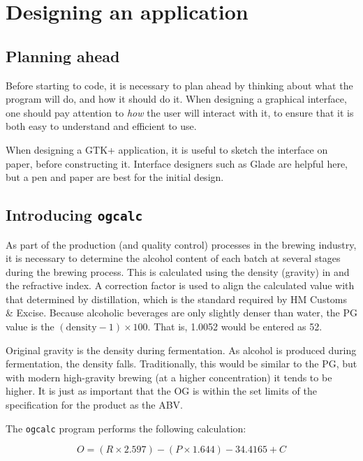 \documentclass[a4paper,oneside]{article}
\newcommand{\program}[1]{\texttt{#1}}
\begin{document}
\section{Designing an application}

\subsection{Planning ahead}

Before starting to code, it is necessary to plan ahead by thinking
about what the program will do, and how it should do it.  When
designing a graphical interface, one should pay attention to
\emph{how} the user will interact with it, to ensure that it is both
easy to understand and efficient to use.

When designing a GTK+ application, it is useful to sketch the
interface on paper, before constructing it.  Interface designers such
as Glade are helpful here, but a pen and paper are best for the
initial design.

\subsection{Introducing \program{ogcalc}}

As part of the production (and quality control) processes in the
brewing industry, it is necessary to determine the alcohol content of
each batch at several stages during the brewing process.  This is
calculated using the density (gravity) in  and the
refractive index.  A correction factor is used to align the calculated
value with that determined by distillation, which is the standard
required by HM Customs \& Excise.  Because alcoholic beverages are
only slightly denser than water, the PG value is the
$(\mathrm{density} -1) \times 100$.  That is, 1.0052 would be entered
as 52.

Original gravity is the density during fermentation.  As alcohol is
produced during fermentation, the density falls.  Traditionally, this
would be similar to the PG, but with modern high-gravity brewing (at a
higher concentration) it tends to be higher.  It is just as important
that the OG is within the set limits of the specification for the
product as the ABV.


The \program{ogcalc} program performs the following calculation:

\begin{equation}
O = (R \times 2.597) - (P \times 1.644) - 34.4165 + C
\end{equation}
\end{document}
